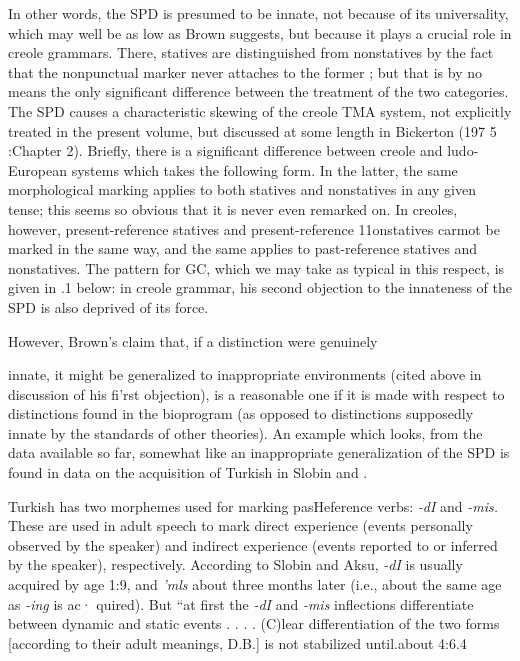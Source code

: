 In other words, the SPD is presumed to be innate, not because of its universality, which may well be as low as Brown suggests, but because it plays a crucial role in creole grammars. There, statives are distinguished from nonstatives by the fact that the nonpunctual marker never attaches to the former ; but that is by no means the only signifi\-cant difference between the treatment of the two categories. The SPD causes a characteristic skewing of the creole TMA system, not explicitly treated in the present volume, but discussed at some length in Bicker\-ton (197 5 :Chapter 2). Briefly, there is a significant difference between creole and ludo-European systems which takes the following form. In the latter, the same morphological marking applies to both statives and nonstatives in any given tense; this seems so obvious that it is never even remarked on. In creoles, however, present-reference statives and present-reference 11onstatives carmot be marked in the same way, and the same applies to past-reference statives and nonstatives. The pattern for GC, which we may take as typical in this respect, is given in .1 below:
in creole grammar, his second objection to the innateness of the SPD is also deprived of its force.

However, Brown's claim that, if a distinction were genuinely

innate, it might be generalized to inappropriate environments (cited above in discussion of his fi'rst objection), is a reasonable one if it is made with respect to distinctions found in the bioprogram (as opposed to distinctions supposedly innate by the standards of other theories). An example which looks, from the data available so far, somewhat like
an inappropriate generalization of the SPD is found in data on the
acquisition of Turkish in Slobin and \citet{Aksu1980}.

Turkish has two morphemes used for marking pasHeference verbs: \textit{{}-dI} and \textit{{}-}\textit{m}\textit{i}\textit{s.} These are used in adult speech to mark direct experience (events personally observed by the speaker) and indirect experience (events reported to or inferred by the speaker), respectively. According to Slobin and Aksu, \textit{{}-dI} is usually acquired by age 1:9, and \textit{'mls} about three months later (i.e., about the same age as \textit{{}-i}\textit{n}\textit{g} is ac· quired). But ``at first the \textit{{}-dI} and \textit{{}-}\textit{m}\textit{i}\textit{s} inflections differentiate between dynamic and static events . . . . (C)lear differentiation of the two
forms [according to their adult meanings, D.B.] is not stabilized until.about 4:6.{\textquotedbl}4


